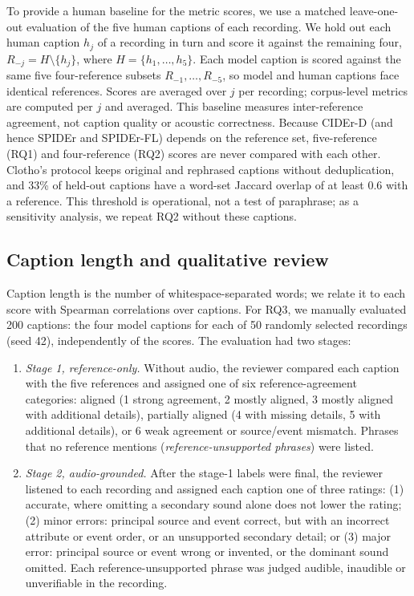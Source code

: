 \documentclass{article}
\begin{document}
To provide a human baseline for the metric scores, we use a matched leave-one-out evaluation of the five human
captions of each recording. We hold out each human caption $h_j$ of a recording in turn
and score it against the remaining four, $R_{-j}=H\setminus\{h_j\}$, where $H=\{h_1,\dots,h_5\}$. Each model caption
is scored against the same five four-reference subsets $R_{-1},\dots,R_{-5}$, so model and human captions face
identical references. Scores are averaged over $j$ per recording; corpus-level metrics are computed per $j$ and
averaged. This baseline measures inter-reference agreement, not caption quality or acoustic correctness. Because
CIDEr-D (and hence SPIDEr and SPIDEr-FL) depends on the reference set, five-reference (RQ1) and four-reference (RQ2)
scores are never compared with each other. Clotho's protocol keeps original and rephrased captions without
deduplication, and 33\% of held-out captions have a word-set Jaccard overlap of at least 0.6 with a reference. This
threshold is operational, not a test of paraphrase; as a sensitivity analysis, we repeat RQ2 without these captions.

\subsection{Caption length and qualitative review}
\label{ssec:review}

Caption length is the number of whitespace-separated words; we relate it to each score with Spearman correlations
over captions. For RQ3, we manually evaluated 200 captions: the four model captions for each of 50 randomly
selected recordings (seed 42), independently of the scores. The evaluation had two stages:

\begin{enumerate}
\item \emph{Stage 1, reference-only.} Without audio, the reviewer compared each caption with the five references and
assigned one of six reference-agreement categories: aligned (1 strong agreement, 2 mostly aligned, 3 mostly aligned
with additional details), partially aligned (4 with missing details, 5 with additional details), or 6 weak agreement
or source/event mismatch. Phrases that no reference mentions (\emph{reference-unsupported phrases}) were listed.
\item \emph{Stage 2, audio-grounded.} After the stage-1 labels were final, the reviewer listened to each recording and assigned
each caption one of three ratings: (1) accurate, where omitting a secondary sound alone does not lower the rating; (2) minor errors:
principal source and event correct, but with an incorrect attribute or event order, or an unsupported secondary detail; or (3) major
error: principal source or event wrong or invented, or the dominant sound omitted. Each reference-unsupported phrase
was judged audible, inaudible or unverifiable in the recording.
\end{enumerate}
\end{document}

